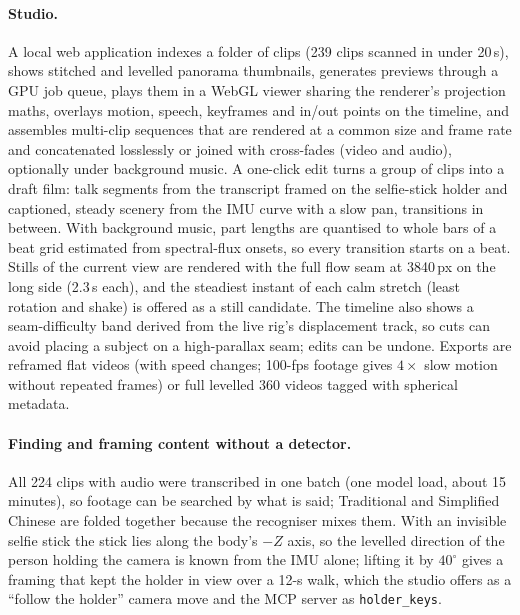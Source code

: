 \documentclass[11pt]{article}
\begin{document}
\paragraph{Studio.} A local web application indexes a folder of clips (239 clips scanned in under 20\,s), shows stitched and levelled panorama thumbnails, generates previews through a GPU job queue, plays them in a WebGL viewer sharing the renderer's projection maths, overlays motion, speech, keyframes and in/out points on the timeline, and assembles multi-clip sequences that are rendered at a common size and frame rate and concatenated losslessly or joined with cross-fades (video and audio), optionally under background music. A one-click edit turns a group of clips into a draft film: talk segments from the transcript framed on the selfie-stick holder and captioned, steady scenery from the IMU curve with a slow pan, transitions in between. With background music, part lengths are quantised to whole bars of a beat grid estimated from spectral-flux onsets, so every transition starts on a beat. Stills of the current view are rendered with the full flow seam at 3840\,px on the long side (2.3\,s each), and the steadiest instant of each calm stretch (least rotation and shake) is offered as a still candidate. The timeline also shows a seam-difficulty band derived from the live rig's displacement track, so cuts can avoid placing a subject on a high-parallax seam; edits can be undone. Exports are reframed flat videos (with speed changes; 100-fps footage gives $4\times$ slow motion without repeated frames) or full levelled 360\textdegree{} videos tagged with spherical metadata.

\paragraph{Finding and framing content without a detector.} All 224 clips with audio were transcribed in one batch (one model load, about 15 minutes), so footage can be searched by what is said; Traditional and Simplified Chinese are folded together because the recogniser mixes them. With an invisible selfie stick the stick lies along the body's $-Z$ axis, so the levelled direction of the person holding the camera is known from the IMU alone; lifting it by $40^\circ$ gives a framing that kept the holder in view over a 12-s walk, which the studio offers as a ``follow the holder'' camera move and the MCP server as \texttt{holder\_keys}.

\end{document}

